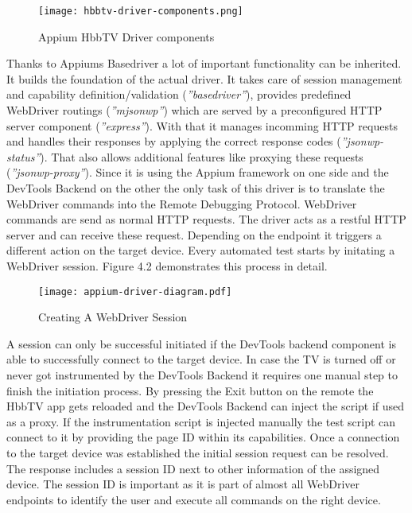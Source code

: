 \vspace{1cm}
\begin{figure}[htb]
  \centering
  \texttt{[image: hbbtv-driver-components.png]}\\
  \caption{Appium HbbTV Driver components}\label{fig:hbbtv-driver-components}
\end{figure}
\vspace{0.5cm}

Thanks to Appiums Basedriver a lot of important functionality can be inherited. It builds the
foundation of the actual driver. It takes care of session management and capability definition/validation
(\textit{''basedriver''}), provides predefined WebDriver routings (\textit{''mjsonwp''}) which are
served by a preconfigured HTTP server component (\textit{''express''}). With that it manages incomming
HTTP requests and handles their responses by applying the correct response codes (\textit{''jsonwp-status''}).
That also allows additional features like proxying these requests (\textit{''jsonwp-proxy''}).
Since it is using the Appium framework on one side and the DevTools Backend on the other the only
task of this driver is to translate the WebDriver commands into the Remote Debugging Protocol.
WebDriver commands are send as normal HTTP requests. The driver acts as a restful HTTP server
and can receive these request. Depending on the endpoint it triggers a different action on the
target device. Every automated test starts by initating a WebDriver session. Figure 4.2 demonstrates
this process in detail.

\vspace{1cm}
\begin{figure}[htb]
  \centering
  \texttt{[image: appium-driver-diagram.pdf]}\\
  \caption{Creating A WebDriver Session}\label{fig:appium-driver-diagram}
\end{figure}
\vspace{0.5cm}

A session can only be successful initiated if the DevTools backend component is able to successfully
connect to the target device. In case the TV is turned off or never got instrumented by the DevTools
Backend it requires one manual step to finish the initiation process. By pressing the Exit button
on the remote the HbbTV app gets reloaded and the DevTools Backend can inject the script if used as
a proxy. If the instrumentation script is injected manually the test script can connect to it by
providing the page ID within its capabilities. Once a connection to the target device was established
the initial session request can be resolved. The response includes a session ID next to other
information of the assigned device. The session ID is important as it is part of almost all WebDriver
endpoints to identify the user and execute all commands on the right device.

